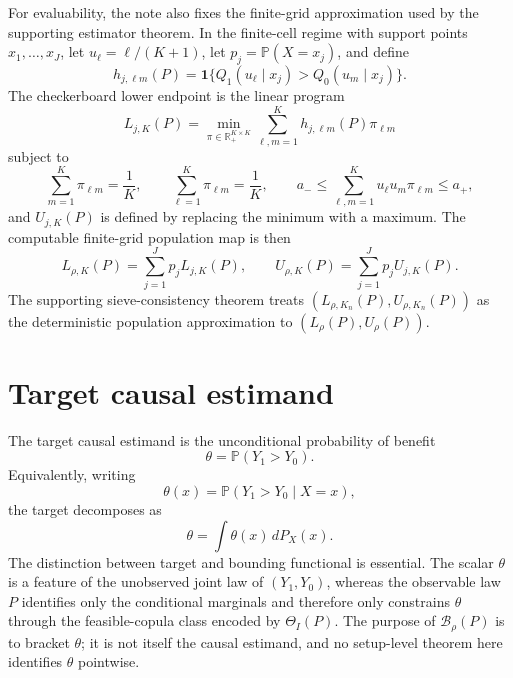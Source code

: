 \documentclass[11pt]{article}
\renewcommand{\Pr}{\mathbb{P}}
\newcommand{\one}{\mathbf{1}}
\newcommand{\R}{\mathbb{R}}
\theoremstyle{definition}
\theoremstyle{plain}
\theoremstyle{remark}
\begin{document}
For evaluability, the note also fixes the finite-grid approximation used by the supporting estimator theorem.  In the finite-cell regime with support points \(x_1,\ldots,x_J\), let \(u_\ell=\ell/(K+1)\), let \(p_j=\Pr(X=x_j)\), and define
\[
h_{j,\ell m}(P)=\one\{Q_1(u_\ell\mid x_j)>Q_0(u_m\mid x_j)\}.
\]
The checkerboard lower endpoint is the linear program
\[
L_{j,K}(P)=\min_{\pi\in\R_+^{K\times K}}
\sum_{\ell,m=1}^K h_{j,\ell m}(P)\pi_{\ell m}
\]
subject to
\[
\sum_{m=1}^K \pi_{\ell m}=\frac{1}{K},\qquad
\sum_{\ell=1}^K \pi_{\ell m}=\frac{1}{K},\qquad
a_-\le \sum_{\ell,m=1}^K u_\ell u_m\pi_{\ell m}\le a_+,
\]
and \(U_{j,K}(P)\) is defined by replacing the minimum with a maximum.  The computable finite-grid population map is then
\[
L_{\rho,K}(P)=\sum_{j=1}^J p_j L_{j,K}(P),\qquad
U_{\rho,K}(P)=\sum_{j=1}^J p_j U_{j,K}(P).
\]
The supporting sieve-consistency theorem treats \((L_{\rho,K_n}(P),U_{\rho,K_n}(P))\) as the deterministic population approximation to \((L_\rho(P),U_\rho(P))\).

\section{Target causal estimand}
The target causal estimand is the unconditional probability of benefit
\[
\theta=\Pr(Y_1>Y_0).
\]
Equivalently, writing
\[
\theta(x)=\Pr(Y_1>Y_0\mid X=x),
\]
the target decomposes as
\[
\theta=\int \theta(x)\,dP_X(x).
\]
The distinction between target and bounding functional is essential.  The scalar \(\theta\) is a feature of the unobserved joint law of \((Y_1,Y_0)\), whereas the observable law \(P\) identifies only the conditional marginals and therefore only constrains \(\theta\) through the feasible-copula class encoded by \(\Theta_I(P)\).  The purpose of \(\mathcal B_\rho(P)\) is to bracket \(\theta\); it is not itself the causal estimand, and no setup-level theorem here identifies \(\theta\) pointwise.
\end{document}
